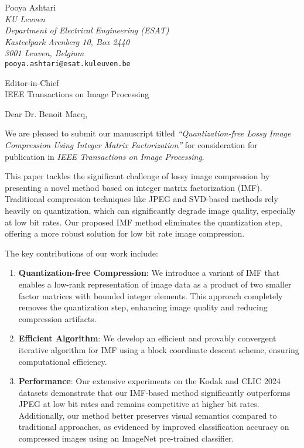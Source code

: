 \documentclass[a4paper,12pt]{letter}
\begin{document}
\begin{letter}{
    
Pooya Ashtari \\
\textit{KU Leuven} \\
\textit{Department of Electrical Engineering (ESAT)} \\
\textit{Kasteelpark Arenberg 10, Box 2440} \\
\textit{3001 Leuven, Belgium} \\
\texttt{pooya.ashtari@esat.kuleuven.be} \\

\bigskip\bigskip

Editor-in-Chief \\
IEEE Transactions on Image Processing}

\opening{Dear Dr. Benoit Macq,}

We are pleased to submit our manuscript titled \textit{``Quantization-free Lossy Image Compression Using Integer Matrix Factorization''} for consideration for publication in \textit{IEEE Transactions on Image Processing}.

This paper tackles the significant challenge of lossy image compression by presenting a novel method based on integer matrix factorization (IMF). Traditional compression techniques like JPEG and SVD-based methods rely heavily on quantization, which can significantly degrade image quality, especially at low bit rates. Our proposed IMF method eliminates the quantization step, offering a more robust solution for low bit rate image compression.

The key contributions of our work include:

\begin{enumerate}
    \item \textbf{Quantization-free Compression}: We introduce a variant of IMF that enables a low-rank representation of image data as a product of two smaller factor matrices with bounded integer elements. This approach completely removes the quantization step, enhancing image quality and reducing compression artifacts.
    \item \textbf{Efficient Algorithm}: We develop an efficient and provably convergent iterative algorithm for IMF using a block coordinate descent scheme, ensuring computational efficiency.
    \item \textbf{Performance}: Our extensive experiments on the Kodak and CLIC 2024 datasets demonstrate that our IMF-based method significantly outperforms JPEG at low bit rates and remains competitive at higher bit rates. Additionally, our method better preserves visual semantics compared to traditional approaches, as evidenced by improved classification accuracy on compressed images using an ImageNet pre-trained classifier.
\end{enumerate}


\end{letter}
\end{document}
